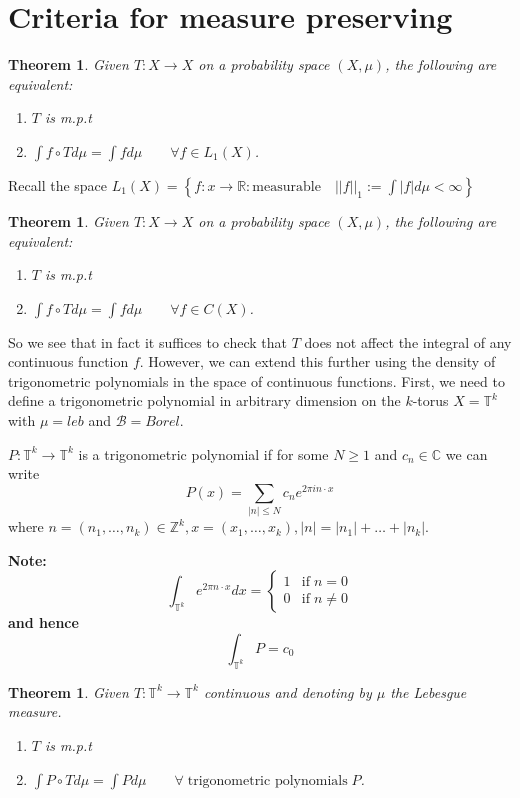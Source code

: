 \documentclass[11pt]{article}
\newcommand{\defeq}{:=}
\newcommand{\abs}[1]{\left|#1\right|}
\newcommand{\norm}[1]{\left|\left|#1\right|\right|}
\newcommand{\ktor}{\mathbb{T}^k}
\newcommand{\R}{\mathbb{R}}
\newcommand{\C}{\mathbb{C}}
\newcommand{\Z}{\mathbb{Z}}
\newenvironment{defin}
	{\begin{mdframed}[backgroundcolor=white, roundcorner=5pt, linewidth=1pt]}
	{\end{mdframed}}
\newcommand{\mdf}[1]{{\color{red} #1}}
\newenvironment{note}
	{\begin{mdframed}[backgroundcolor=white, linecolor=red, roundcorner=5pt, linewidth=1pt]\bfseries{Note:}\normalfont}
	{\end{mdframed}}
\newtheorem{theorem}[prop]{Theorem}
\begin{document}
\section{Criteria for measure preserving}
\begin{theorem}
Given $T:X\to X$ on a probability space $(X,\mu)$, the following are equivalent:
\begin{enumerate}
	\item $T$ is m.p.t
	\item $\int f\circ T d\mu = \int f d\mu \quad\quad \forall f\in L_1(X)$.\end{enumerate}
\end{theorem}
Recall the space $L_1(X)=\left\{ f:x\to\R : \text{measurable}\quad \norm{f}_1 \defeq\int \abs{f} d\mu < \infty \right\}$

\begin{theorem}
Given $T:X\to X$ on a probability space $(X,\mu)$, the following are equivalent:
\begin{enumerate}
	\item $T$ is m.p.t
	\item $\int f\circ T d\mu = \int f d\mu \quad\quad \forall f\in C(X)$.
\end{enumerate}
\end{theorem}

So we see that in fact it suffices to check that $T$ does not affect the integral of any continuous function $f$.
However, we can extend this further using the density of trigonometric polynomials in the space of continuous functions. 
First, we need to define a trigonometric polynomial in arbitrary dimension on the $k$-torus $X=\ktor$ with $\mu=leb$ and $\mathcal{B}=Borel$.
\begin{defin}
	$P:\ktor\to\ktor$ is a \mdf{trigonometric polynomial} if for some $N\geq 1$ and $c_n\in\C$ we can write
	$$P(x)=\sum_{\abs{n}\leq N} c_n e^{2\pi in\cdot x}$$
	where $n=(n_1,\dots,n_k)\in\Z^k, x=(x_1,\dots,x_k), \abs{n}=\abs{n_1}+\dots+\abs{n_k}$.
\end{defin}
\begin{note}
	\[
		\int_{\ktor} e^{2\pi n\cdot x} dx =
		\begin{cases}
			1 & \text{if} \; n=0\\
			0 & \text{if} \; n\neq 0
		\end{cases}
	\]
	and hence
	$$\int_{\ktor}P = c_0$$
\end{note}

\begin{theorem}
Given $T:\ktor\to \ktor$ continuous and denoting by $\mu$ the Lebesgue measure.
\begin{enumerate}
	\item $T$ is m.p.t
	\item $\int P\circ T d\mu = \int P d\mu \quad\quad \forall\; \text{trigonometric polynomials}\; P$. 
\end{enumerate}
\end{theorem}
\end{document}
